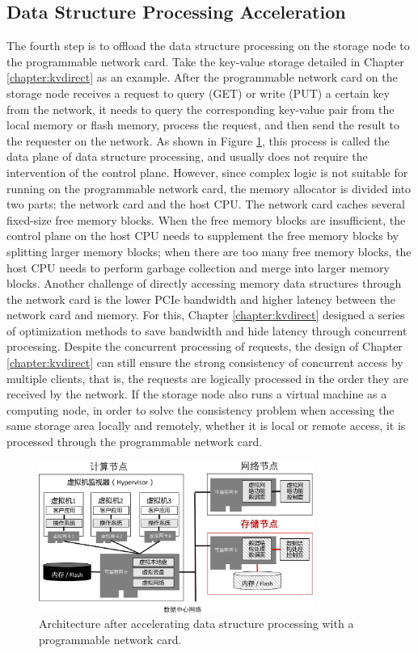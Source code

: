\subsection{Data Structure Processing Acceleration}

The fourth step is to offload the data structure processing on the storage node to the programmable network card.
Take the key-value storage detailed in Chapter \ref{chapter:kvdirect} as an example.
After the programmable network card on the storage node receives a request to query (GET) or write (PUT) a certain key from the network, it needs to query the corresponding key-value pair from the local memory or flash memory, process the request, and then send the result to the requester on the network.
As shown in Figure \ref{arch:fig:data-structure-accel}, this process is called the data plane of data structure processing, and usually does not require the intervention of the control plane.
However, since complex logic is not suitable for running on the programmable network card, the memory allocator is divided into two parts: the network card and the host CPU. The network card caches several fixed-size free memory blocks. When the free memory blocks are insufficient, the control plane on the host CPU needs to supplement the free memory blocks by splitting larger memory blocks; when there are too many free memory blocks, the host CPU needs to perform garbage collection and merge into larger memory blocks.
Another challenge of directly accessing memory data structures through the network card is the lower PCIe bandwidth and higher latency between the network card and memory. For this, Chapter \ref{chapter:kvdirect} designed a series of optimization methods to save bandwidth and hide latency through concurrent processing.
Despite the concurrent processing of requests, the design of Chapter \ref{chapter:kvdirect} can still ensure the strong consistency of concurrent access by multiple clients, that is, the requests are logically processed in the order they are received by the network.
If the storage node also runs a virtual machine as a computing node, in order to solve the consistency problem when accessing the same storage area locally and remotely, whether it is local or remote access, it is processed through the programmable network card.

\begin{figure}[htbp]
	\centering
	\includegraphics[width=0.8\textwidth]{figures/data_structure_accel.pdf}
	\caption{Architecture after accelerating data structure processing with a programmable network card.}
	\label{arch:fig:data-structure-accel}
\end{figure}

